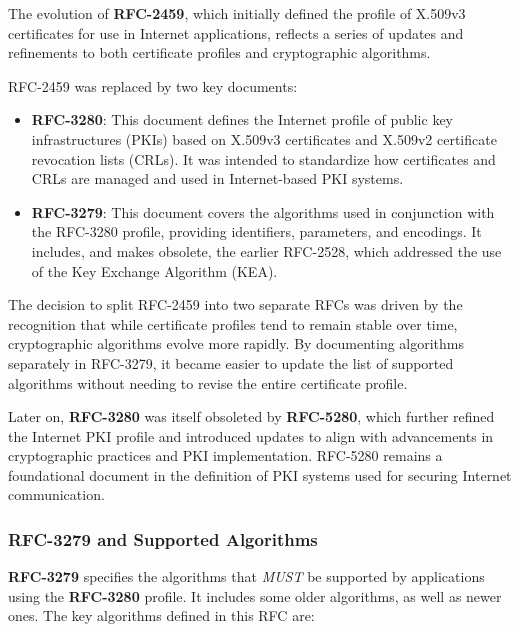 The evolution of \textbf{RFC-2459}, which initially defined the 
profile of X.509v3 certificates for use in Internet applications, 
reflects a series of updates and refinements to both certificate 
profiles and cryptographic algorithms.

RFC-2459 was replaced by two key documents:
\begin{itemize}
    \item \textbf{RFC-3280}: This document defines the Internet 
    profile of public key infrastructures (PKIs) based on X.509v3 
    certificates and X.509v2 certificate revocation lists (CRLs). 
    It was intended to standardize how certificates and CRLs are 
    managed and used in Internet-based PKI systems.
    \item \textbf{RFC-3279}: This document covers the algorithms 
    used in conjunction with the RFC-3280 profile, providing 
    identifiers, parameters, and encodings. It includes, and makes 
    obsolete, the earlier RFC-2528, which addressed the use of 
    the Key Exchange Algorithm (KEA).
\end{itemize}

The decision to split RFC-2459 into two separate RFCs was driven by 
the recognition that while certificate profiles tend to remain stable 
over time, cryptographic algorithms evolve more rapidly. By 
documenting algorithms separately in RFC-3279, it became easier to 
update the list of supported algorithms without needing to revise the 
entire certificate profile.

Later on, \textbf{RFC-3280} was itself obsoleted by \textbf{RFC-5280}, 
which further refined the Internet PKI profile and introduced updates 
to align with advancements in cryptographic practices and PKI 
implementation. RFC-5280 remains a foundational document in the 
definition of PKI systems used for securing Internet communication.
\subsubsection{RFC-3279 and Supported Algorithms}

\textbf{RFC-3279} specifies the algorithms that \emph{MUST} be 
supported by applications using the \textbf{RFC-3280} profile. 
It includes some older algorithms, as well as newer ones. The key 
algorithms defined in this RFC are:

